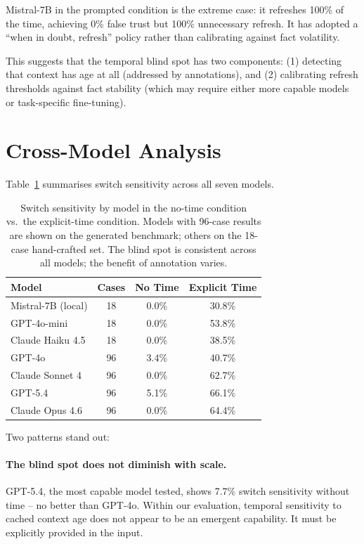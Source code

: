 \documentclass[11pt,a4paper]{article}
\begin{document}
Mistral-7B in the prompted condition is the extreme case: it refreshes 100\% of the time, achieving 0\% false trust but 100\% unnecessary refresh.
It has adopted a ``when in doubt, refresh'' policy rather than calibrating against fact volatility.

This suggests that the temporal blind spot has two components: (1) detecting that context has age at all (addressed by annotations), and (2) calibrating refresh thresholds against fact stability (which may require either more capable models or task-specific fine-tuning).

\section{Cross-Model Analysis}
\label{sec:cross}

Table~\ref{tab:cross} summarises switch sensitivity across all seven models.

\begin{table}[h]
\centering
\caption{Switch sensitivity by model in the no-time condition vs.\ the explicit-time condition. Models with 96-case results are shown on the generated benchmark; others on the 18-case hand-crafted set. The blind spot is consistent across all models; the benefit of annotation varies.}
\label{tab:cross}
\begin{tabular}{lccc}
\toprule
\textbf{Model} & \textbf{Cases} & \textbf{No Time} & \textbf{Explicit Time} \\
\midrule
Mistral-7B (local) & 18 & 0.0\% & 30.8\% \\
GPT-4o-mini & 18 & 0.0\% & 53.8\% \\
Claude Haiku 4.5 & 18 & 0.0\% & 38.5\% \\
\midrule
GPT-4o & 96 & 3.4\% & 40.7\% \\
Claude Sonnet 4 & 96 & 0.0\% & 62.7\% \\
GPT-5.4 & 96 & 5.1\% & 66.1\% \\
Claude Opus 4.6 & 96 & 0.0\% & 64.4\% \\
\bottomrule
\end{tabular}
\end{table}

Two patterns stand out:

\paragraph{The blind spot does not diminish with scale.}
GPT-5.4, the most capable model tested, shows 7.7\% switch sensitivity without time -- no better than GPT-4o.
Within our evaluation, temporal sensitivity to cached context age does not appear to be an emergent capability.
It must be explicitly provided in the input.
\end{document}
